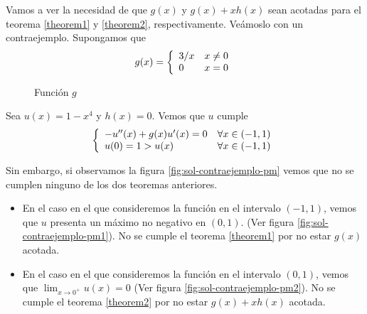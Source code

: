 Vamos a ver la necesidad de que $g(x)$ y $g(x) + xh(x)$ sean acotadas para el teorema \ref{theorem1} y \ref{theorem2}, respectivamente. Veámoslo con un contraejemplo. Supongamos que
\begin{equation*}
g(x) = 
\left\{
\begin{array}{l l}
3/x & x\neq 0\\
0 & x = 0
\end{array}
\right.
\end{equation*}


\begin{figure}[ht]
\centering
\label{fig:g-de-x}
\caption{Función $g$}
\end{figure}

Sea $u(x) = 1-x^4$ y $h(x) = 0$. Vemos que $u$ cumple
\begin{equation*}
\left\{
\begin{array}{l l}
-u''(x) + g(x)u'(x) = 0 & \forall x\in(-1,1)\\
u(0)=1 > u(x) & \forall x\in(-1,1)\\
\end{array}
\right.
\end{equation*}

Sin embargo, si observamos la figura \ref{fig:sol-contraejemplo-pm} vemos que no se cumplen ninguno de los dos teoremas anteriores.
\begin{itemize}
\item En el caso en el que consideremos la función en el intervalo $(-1,1)$, vemos que $u$ presenta un máximo no negativo en $(0,1)$. (Ver figura \ref{fig:sol-contraejemplo-pm1}). No se cumple el teorema \ref{theorem1} por no estar $g(x)$ acotada.
\item En el caso en el que consideremos la función en el intervalo $(0,1)$, vemos que $\lim_{x\to0^+}u(x) = 0$ (Ver figura \ref{fig:sol-contraejemplo-pm2}). No se cumple el teorema \ref{theorem2} por no estar $g(x)+xh(x)$ acotada.
\end{itemize}

